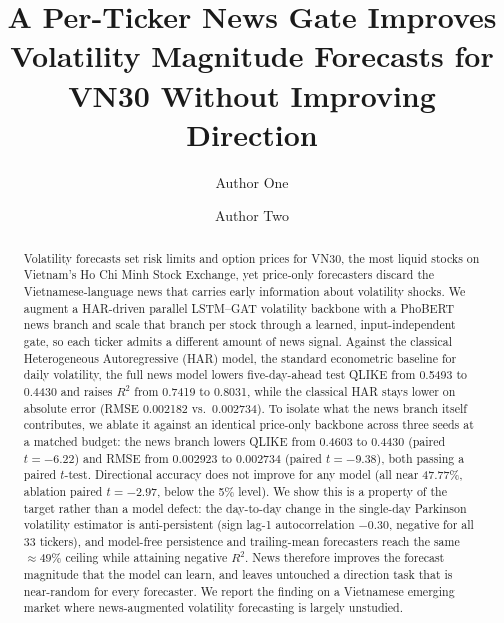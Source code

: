 \documentclass[runningheads]{llncs}
\newcommand{\qlikeHARc}{0.5493}
\newcommand{\rmseHARc}{0.002182}
\newcommand{\rsqHARc}{0.7419}
\newcommand{\qlikeBB}{0.4603}
\newcommand{\rmseBB}{0.002923}
\newcommand{\qlikeNews}{0.4430}
\newcommand{\rmseNews}{0.002734}
\newcommand{\rsqNews}{0.8031}
\newcommand{\diraccNews}{47.77}
\newcommand{\qliketstat}{-6.22}
\newcommand{\rmsetstat}{-9.38}
\newcommand{\diracctstat}{-2.97}
\newcommand{\ntick}{33}
\begin{document}
%
\title{A Per-Ticker News Gate Improves Volatility Magnitude Forecasts for VN30 Without Improving Direction}
%
%
\author{Author One \and Author Two}
%
%
\maketitle
%
\begin{abstract}
Volatility forecasts set risk limits and option prices for VN30, the most liquid stocks on
Vietnam's Ho Chi Minh Stock Exchange, yet price-only forecasters discard the Vietnamese-language news that
carries early information about volatility shocks. We augment a HAR-driven parallel LSTM--GAT
volatility backbone with a PhoBERT news branch and scale that branch per stock through a learned,
input-independent gate, so each ticker admits a different amount of news signal. Against the
classical Heterogeneous Autoregressive (HAR) model, the standard econometric baseline for daily
volatility, the full news model lowers five-day-ahead test QLIKE from \qlikeHARc{} to \qlikeNews{}
and raises $R^2$ from \rsqHARc{} to \rsqNews{}, while the classical HAR stays lower on absolute
error (RMSE \rmseHARc{} vs.\ \rmseNews{}). To isolate what the news branch itself contributes, we
ablate it against an identical price-only backbone across three seeds at a matched budget: the news
branch lowers QLIKE from \qlikeBB{} to \qlikeNews{} (paired $t=\qliketstat$) and RMSE from \rmseBB{}
to \rmseNews{} (paired $t=\rmsetstat$), both passing a paired $t$-test. Directional accuracy does
not improve for any model (all near \diraccNews\%, ablation paired $t=\diracctstat$, below the 5\%
level). We show this is a property of the target rather than a model defect: the day-to-day change
in the single-day Parkinson volatility estimator is anti-persistent (sign lag-1 autocorrelation
$-0.30$, negative for all \ntick{} tickers), and model-free persistence and trailing-mean
forecasters reach the same $\approx 49\%$ ceiling while attaining negative $R^2$. News therefore
improves the forecast magnitude that the model can learn, and leaves untouched a direction task that
is near-random for every forecaster. We report the finding on a Vietnamese emerging market where
news-augmented volatility forecasting is largely unstudied.

\end{abstract}
%
\end{document}
